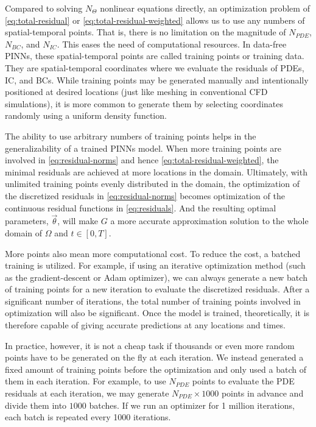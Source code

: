 
Compared to solving $N_\Theta$ nonlinear equations directly, an optimization problem of \eqref{eq:total-residual} or \eqref{eq:total-residual-weighted} allows us to use any numbers of spatial-temporal points.
That is, there is no limitation on the magnitude of $N_{PDE}$, $N_{BC}$, and $N_{IC}$.
This eases the need of computational resources.
In data-free PINNs, these spatial-temporal points are called training points or training data.
They are spatial-temporal coordinates where we evaluate the residuals of PDEs, IC, and BCs.
While training points may be generated manually and intentionally positioned at desired locations (just like meshing in conventional CFD simulations), it is more common to generate them by selecting coordinates randomly using a uniform density function. 

The ability to use arbitrary numbers of training points helps in the generalizability of a trained PINNs model.
When more training points are involved in \eqref{eq:residual-norms} and hence \eqref{eq:total-residual-weighted}, the minimal residuals are achieved at more locations in the domain. 
Ultimately, with unlimited training points evenly distributed in the domain, the optimization of the discretized residuals in \eqref{eq:residual-norms} becomes optimization of the continuous residual functions in \eqref{eq:residuals}. 
And the resulting optimal parameters, $\vec{\theta}$, will make $G$ a more accurate approximation solution to the whole domain of $\Omega$ and $t\in[0, T]$.

More points also mean more computational cost.
To reduce the cost, a batched training is utilized.
For example, if using an iterative optimization method (such as the gradient-descent or Adam optimizer), we can always generate a new batch of training points for a new iteration to evaluate the discretized residuals.
After a significant number of iterations, the total number of training points involved in optimization will also be significant.
Once the model is trained, theoretically, it is therefore capable of giving accurate predictions at any locations and times.

In practice, however, it is not a cheap task if thousands or even more random points have to be generated on the fly at each iteration.
We instead generated a fixed amount of training points before the optimization and only used a batch of them in each iteration.
For example, to use $N_{PDE}$ points to evaluate the PDE residuals at each iteration, we may generate $N_{PDE}\times 1000$ points in advance and divide them into $1000$ batches.
If we run an optimizer for 1 million iterations, each batch is repeated every 1000 iterations.

